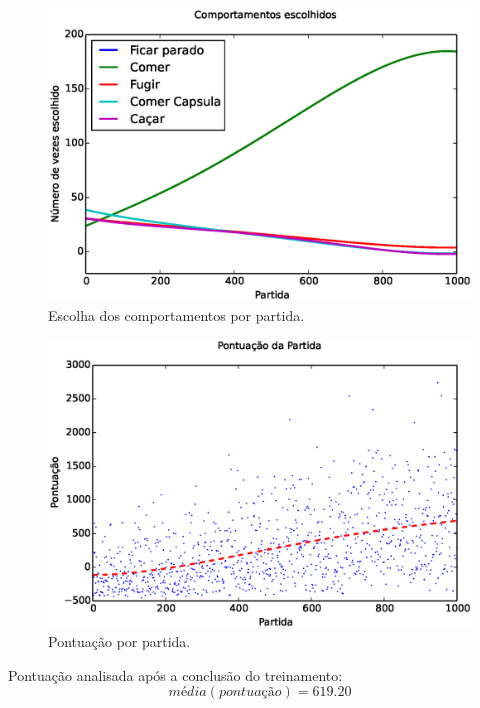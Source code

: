 \documentclass{beamer}
\begin{document}
\begin{frame}
\begin{figure}[H]
    \centering
    \includegraphics[width=\linewidth]{images/5_behaviors_original_map/chosen_behaviors_pol}
    \caption{Escolha dos comportamentos por partida.}
    \label{img:5ComportamentosMapaOriginal:ComportamentosEscolhidosPolinomio}
\end{figure}
\end{frame}


\begin{frame}
\begin{figure}[h]
    \centering
    \includegraphics[width=0.7\linewidth]{images/5_behaviors_original_map/match_scores____pol}
    \caption{Pontuação por partida.}
    \label{img:5ComportamentosMapaOriginal:PontuacaoPorPartida}
\end{figure}

Pontuação analisada após a conclusão do treinamento:
$$ \textit{média} \left( \textit{pontuação} \right) = 619.20 $$
\end{frame}
\end{document}
